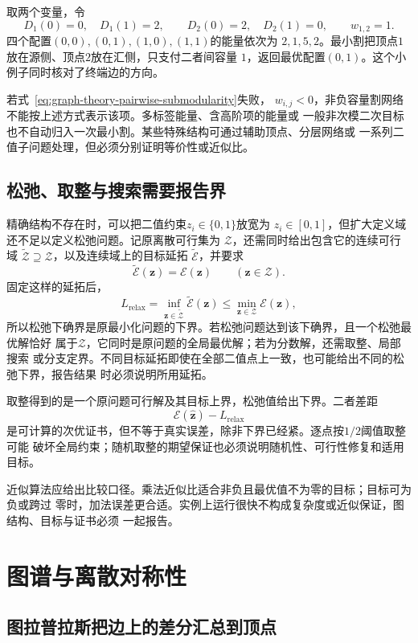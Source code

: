 取两个变量，令
\[
  D_1(0)=0,\quad D_1(1)=2,\qquad
  D_2(0)=2,\quad D_2(1)=0,\qquad
  w_{1,2}=1.
\]
四个配置\((0,0),(0,1),(1,0),(1,1)\)的能量依次为
\(2,1,5,2\)。最小割把顶点\(1\)放在源侧、顶点\(2\)放在汇侧，只支付二者间容量
\(1\)，返回最优配置\((0,1)\)。这个小例子同时核对了终端边的方向。

若式~\eqref{eq:graph-theory-pairwise-submodularity}失败，
\(w_{i,j}<0\)，非负容量割网络不能按上述方式表示该项。多标签能量、含高阶项的能量或
一般非次模二次目标也不自动归入一次最小割。某些特殊结构可通过辅助顶点、分层网络或
一系列二值子问题处理，但必须分别证明等价性或近似比。

\subsection{松弛、取整与搜索需要报告界}

精确结构不存在时，可以把二值约束\(z_i\in\{0,1\}\)放宽为
\(z_i\in[0,1]\)，但扩大定义域还不足以定义松弛问题。记原离散可行集为
\(\mathcal{Z}\)，还需同时给出包含它的连续可行域
\(\widetilde{\mathcal{Z}}\supseteq\mathcal{Z}\)，以及连续域上的目标延拓
\(\widetilde{\mathcal{E}}\)，并要求
\[
  \widetilde{\mathcal{E}}(\bm{z})=\mathcal{E}(\bm{z})
  \qquad(\bm{z}\in\mathcal{Z}).
\]
固定这样的延拓后，
\[
  L_{\mathrm{relax}}
  =\inf_{\bm{z}\in\widetilde{\mathcal{Z}}}
    \widetilde{\mathcal{E}}(\bm{z})
  \leq
  \min_{\bm{z}\in\mathcal{Z}}\mathcal{E}(\bm{z}),
\]
所以松弛下确界是原最小化问题的下界。若松弛问题达到该下确界，且一个松弛最优解恰好
属于\(\mathcal{Z}\)，它同时是原问题的全局最优解；若为分数解，还需取整、局部搜索
或分支定界。不同目标延拓即使在全部二值点上一致，也可能给出不同的松弛下界，报告结果
时必须说明所用延拓。

取整得到的是一个原问题可行解及其目标上界，松弛值给出下界。二者差距
\[
  \mathcal{E}(\widehat{\bm{z}})-L_{\mathrm{relax}}
\]
是可计算的次优证书，但不等于真实误差，除非下界已经紧。逐点按\(1/2\)阈值取整可能
破坏全局约束；随机取整的期望保证也必须说明随机性、可行性修复和适用目标。

近似算法应给出比较口径。乘法近似比适合非负且最优值不为零的目标；目标可为负或跨过
零时，加法误差更合适。实例上运行很快不构成复杂度或近似保证，图结构、目标与证书必须
一起报告。

\section{图谱与离散对称性}
\label{sec:graph-theory-spectrum-discrete-symmetry}

\subsection{图拉普拉斯把边上的差分汇总到顶点}

